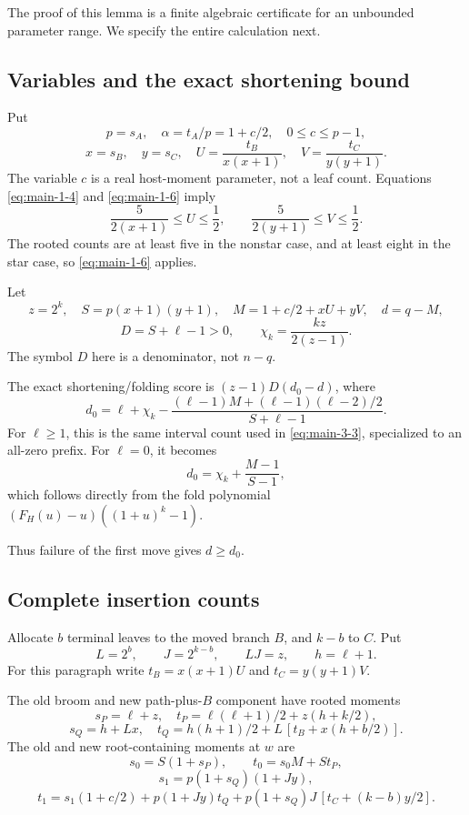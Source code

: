 \documentclass[11pt,letterpaper]{article}
\theoremstyle{plain}
\begin{document}
The proof of this lemma is a finite algebraic certificate for an unbounded parameter range. We specify the entire calculation next.

\subsection{Variables and the exact shortening bound}\label{variables-and-the-exact-shortening-bound}

Put \[
p=s_A,\quad \alpha=t_A/p=1+c/2,\quad 0\le c\le p-1,
\] \[
x=s_B,\quad y=s_C,\quad
U=\frac{t_B}{x(x+1)},\quad V=\frac{t_C}{y(y+1)}.
\] The variable \(c\) is a real host-moment parameter, not a leaf count. Equations \eqref{eq:main-1-4} and \eqref{eq:main-1-6} imply \[
\frac5{2(x+1)}\le U\le\frac12,
\qquad
\frac5{2(y+1)}\le V\le\frac12.
\tag{4.2}\label{eq:main-4-2}
\] The rooted counts are at least five in the nonstar case, and at least eight in the star case, so \eqref{eq:main-1-6} applies.

Let \[
z=2^k,\quad S=p(x+1)(y+1),\quad
M=1+c/2+xU+yV,\quad d=q-M,
\] \[
D=S+\ell-1>0,\qquad \chi_k=\frac{kz}{2(z-1)}.
\] The symbol \(D\) here is a denominator, not \(n-q\).

The exact shortening/folding score is \((z-1)D(d_0-d)\), where \[
\boxed{
d_0=\ell+\chi_k-
\frac{(\ell-1)M+(\ell-1)(\ell-2)/2}{S+\ell-1}.
}
\tag{4.3}\label{eq:main-4-3}
\] For \(\ell\ge1\), this is the same interval count used in \eqref{eq:main-3-3}, specialized to an all-zero prefix. For \(\ell=0\), it becomes \[
d_0=\chi_k+\frac{M-1}{S-1},
\] which follows directly from the fold polynomial \((F_H(u)-u)((1+u)^k-1)\).

Thus failure of the first move gives \(d\ge d_0\).

\subsection{Complete insertion counts}\label{complete-insertion-counts}

Allocate \(b\) terminal leaves to the moved branch \(B\), and \(k-b\) to \(C\). Put \[
L=2^b,\qquad J=2^{k-b},\qquad LJ=z,\qquad h=\ell+1.
\] For this paragraph write \(t_B=x(x+1)U\) and \(t_C=y(y+1)V\).

The old broom and new path-plus-\(B\) component have rooted moments \[
s_P=\ell+z,\quad
 t_P=\ell(\ell+1)/2+z(h+k/2),
\] \[
s_Q=h+Lx,\quad
 t_Q=h(h+1)/2+L\,[t_B+x(h+b/2)].
\tag{4.4}\label{eq:main-4-4}
\] The old and new root-containing moments at \(w\) are \[
s_0=S(1+s_P),\qquad t_0=s_0M+St_P,
\] \[
s_1=p(1+s_Q)(1+Jy),
\] \[
t_1=s_1(1+c/2)+p(1+Jy)t_Q
     +p(1+s_Q)J\,[t_C+(k-b)y/2].
\tag{4.5}\label{eq:main-4-5}
\]
\end{document}
